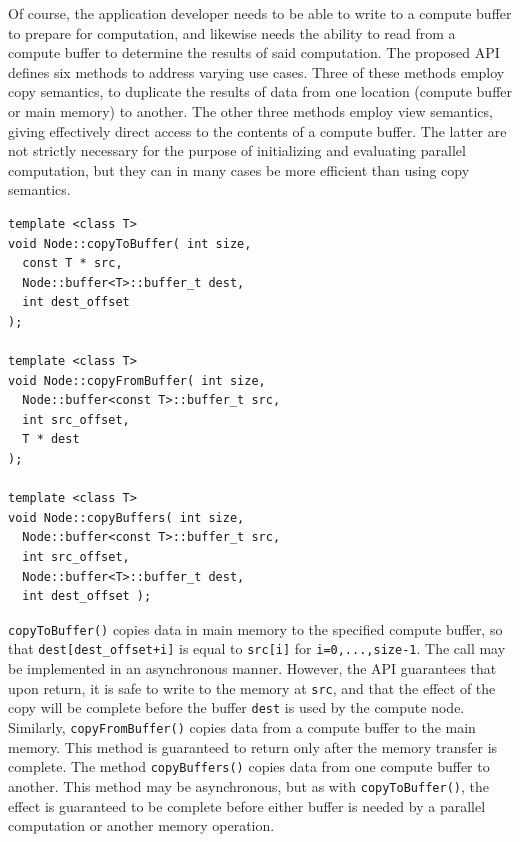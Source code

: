 \documentclass[10pt,conference,letterpaper]{IEEEtran}
\begin{document}
Of course, the application developer needs to be able to write to a compute buffer to prepare for computation, and likewise needs the ability to read from a compute buffer to determine the results of said computation. The proposed API defines six methods to address varying use cases. Three of these methods employ copy semantics, to duplicate the results of data from one location (compute buffer or main memory) to another. The other three methods employ view semantics, giving effectively direct access to the contents of a compute buffer. The latter are not strictly necessary for the purpose of initializing and evaluating parallel computation, but they can in many cases be more efficient than using copy semantics.

{\small \begin{verbatim}
template <class T>
void Node::copyToBuffer( int size, 
  const T * src,
  Node::buffer<T>::buffer_t dest, 
  int dest_offset
);                    

template <class T>
void Node::copyFromBuffer( int size, 
  Node::buffer<const T>::buffer_t src, 
  int src_offset, 
  T * dest
);                    

template <class T>
void Node::copyBuffers( int size, 
  Node::buffer<const T>::buffer_t src, 
  int src_offset, 
  Node::buffer<T>::buffer_t dest, 
  int dest_offset );                    
\end{verbatim}}
\verb!copyToBuffer()! copies data in main memory to the specified compute buffer, so that \verb!dest[dest_offset+i]! is equal to \verb!src[i]! for \verb!i=0,...,size-1!. The call may be implemented in an asynchronous manner. However, the API guarantees that upon return, it is safe to write to the memory at \verb!src!, and that the effect of the copy will be complete before the buffer \verb!dest! is used by the compute node. Similarly, \verb!copyFromBuffer()! copies data from a compute buffer to the main memory. This method is guaranteed to return only after the memory transfer is complete. The method \verb!copyBuffers()! copies data from one compute buffer to another. This method may be asynchronous, but as with \verb!copyToBuffer()!, the effect is guaranteed to be complete before either buffer is needed by a parallel computation or another memory operation.
\end{document}
